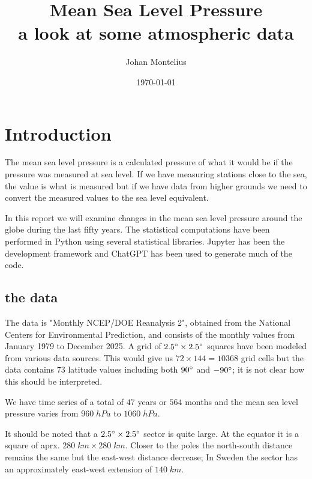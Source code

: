 \documentclass[a4paper,11pt]{article}
\begin{document}
\title{
  \textbf{Mean Sea Level Pressure} \\
  a look at some atmospheric data
}
\author{Johan Montelius}
\date{\today}

\maketitle

\section*{Introduction}

The mean sea level pressure is a calculated pressure of what it would
be if the pressure was measured at sea level. If we have measuring
stations close to the sea, the value is what is measured but if we have
data from higher grounds we need to convert the measured values to the
sea level equivalent.

In this report we will examine changes in the mean sea level pressure
around the globe during the last fifty years. The statistical
computations have been performed in Python using several statistical
libraries. Jupyter has been the development framework and ChatGPT has
been used to generate much of the code.

\subsection*{the data}

The data is "Monthly NCEP/DOE Reanalysis 2", obtained from the
National Centers for Environmental Prediction, and consists of the
monthly values from January 1979 to December 2025. A grid of $2.5
\degree \times 2.5 \degree$ squares have been modeled from various
data sources. This would give us $72 \times 144 = 10 368$ grid cells
but the data contains $73$ latitude values including both
$90\degree$ and $-90\degree$; it is not clear how this should be
interpreted.

We have time series of a total of $47$ years or $564$ months and the
mean sea level pressure varies from $960\; hPa$ to $1060\; hPa$.
 
It should be noted that a $2.5 \degree \times 2.5 \degree$ sector is
quite large. At the equator it is a square of aprx. $280 \; km \times
280\; km$. Closer to the poles the north-south distance remains the
same but the east-west distance decrease; In Sweden the sector has an
approximately east-west extension of $140\; km$.
\end{document}
